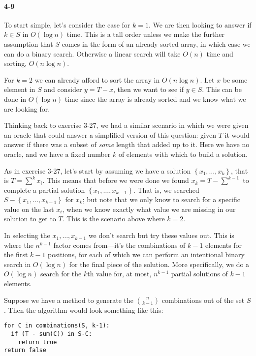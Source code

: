 \documentclass{report}
\begin{document}
\paragraph{4-9} To start simple, let's consider the case for $k=1$. We are then looking to answer if $k\in S$ in $O(\log n)$ time. This is a tall order unless we make the further assumption that $S$ comes in the form of an already sorted array, in which case we can do a binary search. Otherwise a linear search will take $O(n)$ time and sorting, $O(n\log n)$.

For $k=2$ we can already afford to sort the array in $O(n\log n)$. Let $x$ be some element in $S$ and consider $y=T-x$, then we want to see if $y\in S$. This can be done in $O(\log n)$ time since the array is already sorted and we know what we are looking for.

Thinking back to exercise 3-27, we had a similar scenario in which we were given an oracle that could answer a simplified version of this question: given $T$ it would answer if there was a subset of \emph{some} length that added up to it. Here we have no oracle, and we have a fixed number $k$ of elements with which to build a solution.

As in exercise 3-27, let's start by assuming we have a solution $\left\{ x_1,\ldots,x_k \right\}$, that is $T = \sum^k x_i$. This means that before we were done we found $x_k = T - \sum^{k-1}$ to complete a partial solution $\left\{ x_1,\ldots,x_{k-1}\right\}$. That is, we searched $S - \left\{x_1,\ldots,x_{k-1}\right\}$ for $x_k$; but note that we only know to search for a specific value on the last $x_i$, when we know exactly what value we are missing in our solution to get to $T$. This is the scenario above where $k=2$.

In selecting the $x_1,\ldots,x_{k-1}$ we don't search but try these values out. This is where the $n^{k-1}$ factor comes from---it's the combinations of $k-1$ elements for the first $k-1$ positions, for each of which we can perform an intentional binary search in $O(\log n)$ for the final piece of the solution. More specifically, we do a $O(\log n)$ search for the $k$th value for, at most, $n^{k-1}$ partial solutions of $k-1$ elements.

Suppose we have a method to generate the $\binom{n}{k-1}$ combinations out of the set $S$. Then the algorithm would look something like this:
\begin{lstlisting}
for C in combinations(S, k-1):
  if (T - sum(C)) in S-C:
    return true
return false
\end{lstlisting}
\end{document}
